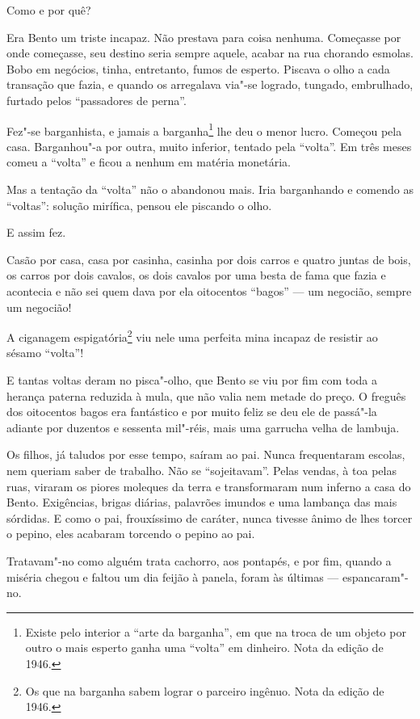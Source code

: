 Como e por quê?

Era Bento um triste incapaz. Não prestava para coisa nenhuma. Começasse
por onde começasse, seu destino seria sempre aquele, acabar na rua
chorando esmolas. Bobo em negócios, tinha, entretanto, fumos de esperto.
Piscava o olho a cada transação que fazia, e quando os arregalava via"-se
logrado, tungado, embrulhado, furtado pelos ``passadores de perna''.

Fez"-se barganhista, e jamais a barganha\footnote{Existe pelo interior a
  ``arte da barganha'', em que na troca de um objeto por outro o mais
  esperto ganha uma ``volta'' em dinheiro. Nota da edição de 1946.} lhe
deu o menor lucro. Começou pela casa. Barganhou"-a por outra, muito
inferior, tentado pela ``volta''. Em três meses comeu a ``volta'' e
ficou a nenhum em matéria monetária.

Mas a tentação da ``volta'' não o abandonou mais. Iria barganhando e
comendo as ``voltas'': solução mirífica, pensou ele piscando o olho.

E assim fez.

Casão por casa, casa por casinha, casinha por dois carros e quatro
juntas de bois, os carros por dois cavalos, os dois cavalos por uma
besta de fama que fazia e acontecia e não sei quem dava por ela
oitocentos ``bagos'' --- um negocião, sempre um negocião!

A ciganagem espigatória\footnote{Os que na barganha sabem lograr o
  parceiro ingênuo. Nota da edição de 1946.} viu nele uma perfeita mina
incapaz de resistir ao sésamo ``volta''!

E tantas voltas deram no pisca"-olho, que Bento se viu por fim com toda a
herança paterna reduzida à mula, que não valia nem metade do preço. O
freguês dos oitocentos bagos era fantástico e por muito feliz se deu ele
de passá"-la adiante por duzentos e sessenta mil"-réis, mais uma garrucha
velha de lambuja.

Os filhos, já taludos por esse tempo, saíram ao pai. Nunca frequentaram
escolas, nem queriam saber de trabalho. Não se ``sojeitavam''. Pelas
vendas, à toa pelas ruas, viraram os piores moleques da terra e
transformaram num inferno a casa do Bento. Exigências, brigas diárias,
palavrões imundos e uma lambança das mais sórdidas. E como o pai,
frouxíssimo de caráter, nunca tivesse ânimo de lhes torcer o pepino,
eles acabaram torcendo o pepino ao pai.

Tratavam"-no como alguém trata cachorro, aos pontapés, e por fim, quando
a miséria chegou e faltou um dia feijão à panela, foram às últimas ---
espancaram"-no.

